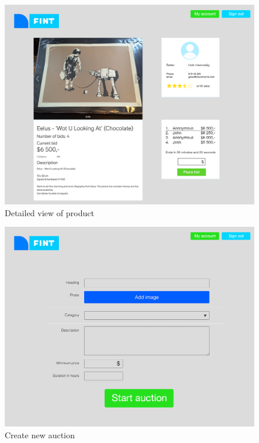 \begin{figure}
	\caption{Detailed view of product}
	\centering
		\includegraphics[scale=0.38]{figures/detailed-view-of-product}
\end{figure}

\begin{figure}
	\caption{Create new auction}
	\centering
		\includegraphics[scale=0.38]{figures/Create-new-auction}
\end{figure}



